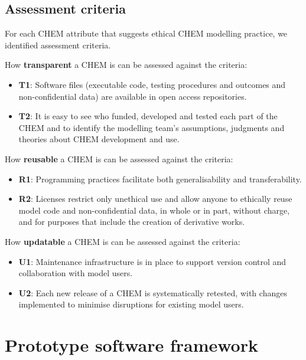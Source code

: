 \documentclass[sn-vancouver,Numbered,pdflatex]{sn-jnl}
\theoremstyle{remark}
\theoremstyle{definition}
\begin{document}
\hypertarget{assessment-criteria}{%
\subsection{Assessment criteria}\label{assessment-criteria}}

For each CHEM attribute that suggests ethical CHEM modelling practice, we identified assessment criteria.

How \textbf{transparent} a CHEM is can be assessed against the criteria:

\begin{itemize}
\item
  \textbf{T1}: Software files (executable code, testing procedures and outcomes and non-confidential data) are available in open access repositories.
\item
  \textbf{T2}: It is easy to see who funded, developed and tested each part of the CHEM and to identify the modelling team's assumptions, judgments and theories about CHEM development and use.
\end{itemize}

How \textbf{reusable} a CHEM is can be assessed against the criteria:

\begin{itemize}
\item
  \textbf{R1}: Programming practices facilitate both generalisability and transferability.
\item
  \textbf{R2}: Licenses restrict only unethical use and allow anyone to ethically reuse model code and non-confidential data, in whole or in part, without charge, and for purposes that include the creation of derivative works.
\end{itemize}

How \textbf{updatable} a CHEM is can be assessed against the criteria:

\begin{itemize}
\item
  \textbf{U1}: Maintenance infrastructure is in place to support version control and collaboration with model users.
\item
  \textbf{U2}: Each new release of a CHEM is systematically retested, with changes implemented to minimise disruptions for existing model users.
\end{itemize}

\hypertarget{prototype-software-framework}{%
\section{Prototype software framework}\label{prototype-software-framework}}
\end{document}
